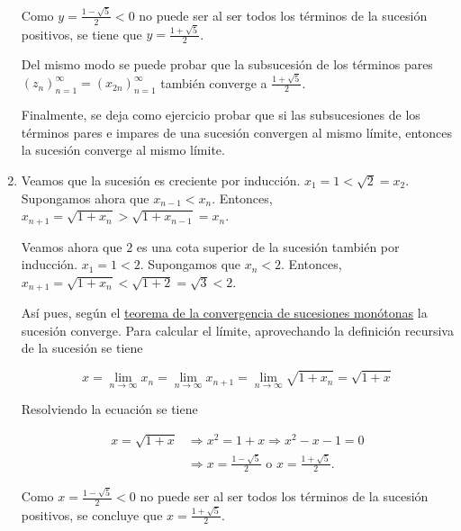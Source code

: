 \documentclass[
  a4paper,
]{scrreport}
\theoremstyle{definition}
\theoremstyle{remark}
\begin{document}
\begin{tcolorbox}
\begin{enumerate}
  Como \(y=\frac{1-\sqrt{5}}{2}<0\) no puede ser al ser todos los
  términos de la sucesión positivos, se tiene que
  \(y=\frac{1+\sqrt{5}}{2}\).

  Del mismo modo se puede probar que la subsucesión de los términos
  pares \((z_n)_{n=1}^\infty = (x_{2n})_{n=1}^\infty\) también converge
  a \(\frac{1+\sqrt{5}}{2}\).

  Finalmente, se deja como ejercicio probar que si las subsucesiones de
  los términos pares e impares de una sucesión convergen al mismo
  límite, entonces la sucesión converge al mismo límite.
\item
  Veamos que la sucesión es creciente por inducción.
  \(x_1=1<\sqrt{2}=x_2\). Supongamos ahora que \(x_{n-1}<x_n\).
  Entonces, \(x_{n+1} = \sqrt{1+x_n} > \sqrt{1+x_{n-1}} = x_n\).

  Veamos ahora que \(2\) es una cota superior de la sucesión también por
  inducción. \(x_1 = 1 < 2\). Supongamos que \(x_n<2\). Entonces,
  \(x_{n+1}=\sqrt{1+x_n} < \sqrt{1+2} = \sqrt{3} < 2\).

  Así pues, según el
  \href{https://aprendeconalf.es/analisis-manual/sucesiones.html\#thm-convergencia-monotona}{teorema
  de la convergencia de sucesiones monótonas} la sucesión converge. Para
  calcular el límite, aprovechando la definición recursiva de la
  sucesión se tiene

  \[
   x = \lim_{n\to\infty}x_n = \lim_{n\to\infty}x_{n+1} = \lim_{n\to\infty}\sqrt{1+x_n} = \sqrt{1+x}
   \]

  Resolviendo la ecuación se tiene

  \begin{align*}
   x=\sqrt{1+x} &\Rightarrow x^2=1+x \Rightarrow x^2-x-1=0 \\ 
   &\Rightarrow x=\frac{1-\sqrt{5}}{2} \mbox{ o } x=\frac{1+\sqrt{5}}{2}.
   \end{align*}

  Como \(x=\frac{1-\sqrt{5}}{2}<0\) no puede ser al ser todos los
  términos de la sucesión positivos, se concluye que
  \(x=\frac{1+\sqrt{5}}{2}\).
\end{enumerate}

\end{tcolorbox}
\end{document}
